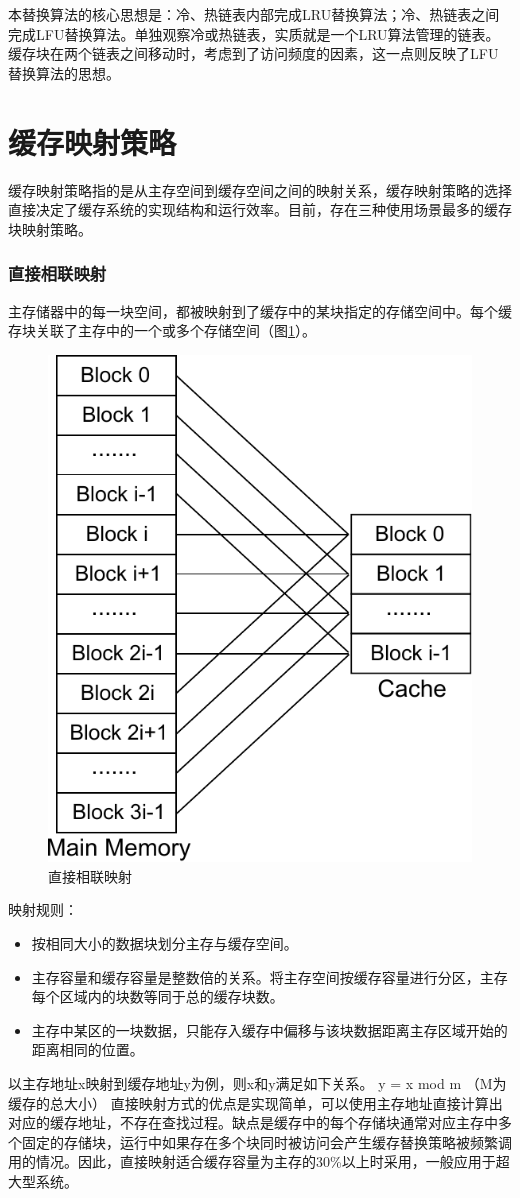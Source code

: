 本替换算法的核心思想是：冷、热链表内部完成LRU替换算法；冷、热链表之间完成LFU替换算法。单独观察冷或热链表，实质就是一个LRU算法管理的链表。缓存块在两个链表之间移动时，考虑到了访问频度的因素，这一点则反映了LFU替换算法的思想。

\section{缓存映射策略}
\label{sec:cache_mapping}

缓存映射策略指的是从主存空间到缓存空间之间的映射关系，缓存映射策略的选择直接决定了缓存系统的实现结构和运行效率。目前，存在三种使用场景最多的缓存块映射策略\cite{cachemap2013}。

\subsubsection{直接相联映射}

主存储器中的每一块空间，都被映射到了缓存中的某块指定的存储空间中。每个缓存块关联了主存中的一个或多个存储空间（图\ref{fig:cache-map-1}）。

\begin{figure}[H]
\centering
\includegraphics[width=0.4\linewidth]{./graph/cache-map-1}
\caption{直接相联映射}
\label{fig:cache-map-1}
\end{figure}

映射规则：
\begin{itemize}
\item 按相同大小的数据块划分主存与缓存空间。
\item 主存容量和缓存容量是整数倍的关系。将主存空间按缓存容量进行分区，主存每个区域内的块数等同于总的缓存块数。 
\item 主存中某区的一块数据，只能存入缓存中偏移与该块数据距离主存区域开始的距离相同的位置。
\end{itemize}

以主存地址x映射到缓存地址y为例，则x和y满足如下关系。
y = x mod m	（M为缓存的总大小）
直接映射方式的优点是实现简单，可以使用主存地址直接计算出对应的缓存地址，不存在查找过程。缺点是缓存中的每个存储块通常对应主存中多个固定的存储块，运行中如果存在多个块同时被访问会产生缓存替换策略被频繁调用的情况。因此，直接映射适合缓存容量为主存的30\%以上时采用，一般应用于超大型系统。

